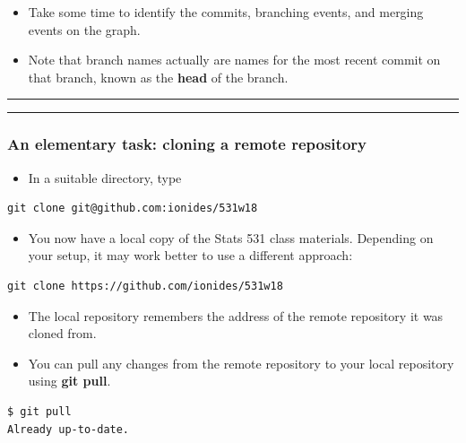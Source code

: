 \documentclass[]{article}
\providecommand{\tightlist}{%
  \setlength{\itemsep}{0pt}\setlength{\parskip}{0pt}}
\begin{document}
\begin{itemize}
\item
  Take some time to identify the commits, branching events, and merging
  events on the graph.
\item
  Note that branch names actually are names for the most recent commit
  on that branch, known as the \textbf{head} of the branch.
\end{itemize}

\begin{center}\rule{0.5\linewidth}{\linethickness}\end{center}

\begin{center}\rule{0.5\linewidth}{\linethickness}\end{center}

\subsubsection{An elementary task: cloning a remote
repository}\label{an-elementary-task-cloning-a-remote-repository}

\begin{itemize}
\tightlist
\item
  In a suitable directory, type
\end{itemize}

\begin{verbatim}
git clone git@github.com:ionides/531w18
\end{verbatim}

\begin{itemize}
\tightlist
\item
  You now have a local copy of the Stats 531 class materials. Depending
  on your setup, it may work better to use a different approach:
\end{itemize}

\begin{verbatim}
git clone https://github.com/ionides/531w18
\end{verbatim}

\begin{itemize}
\item
  The local repository remembers the address of the remote repository it
  was cloned from.
\item
  You can pull any changes from the remote repository to your local
  repository using \textbf{git pull}.
\end{itemize}

\begin{verbatim}
$ git pull
Already up-to-date.
\end{verbatim}
\end{document}

